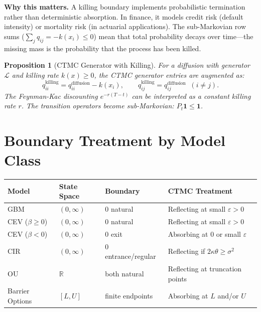 \documentclass[11pt,a4paper,openany]{book}
\theoremstyle{definition}
\theoremstyle{plain}
\newtheorem{proposition}[theorem]{Proposition}
\theoremstyle{remark}
\newcommand{\1}{\mathbbm{1}}
\newcommand{\R}{\mathbb{R}}
\begin{document}
\medskip
\noindent\textbf{Why this matters.} A killing boundary implements probabilistic termination rather than deterministic absorption. In finance, it models credit risk (default intensity) or mortality risk (in actuarial applications). The sub-Markovian row sums ($\sum_{j} q_{ij} = -k(x_i) \leq 0$) mean that total probability decays over time---the missing mass is the probability that the process has been killed.

\begin{proposition}[CTMC Generator with Killing]
For a diffusion with generator $\mathcal{L}$ and killing rate $k(x) \geq 0$, the CTMC generator entries are augmented as:
\[
q_{ii}^{\text{killing}} = q_{ii}^{\text{diffusion}} - k(x_{i}), \qquad q_{ij}^{\text{killing}} = q_{ij}^{\text{diffusion}} \;\; (i \neq j).
\]
The Feynman-Kac discounting $e^{-r(T-t)}$ can be interpreted as a constant killing rate $r$. The transition operators become sub-Markovian: $P_{t} \mathbf{1} \leq \mathbf{1}$.
\end{proposition}

\section{Boundary Treatment by Model Class}

\begin{center}
\begin{tabular}{>{\raggedright\arraybackslash}p{2.5cm}>{\raggedright\arraybackslash}p{2.8cm}>{\raggedright\arraybackslash}p{2.5cm}>{\raggedright\arraybackslash}p{4cm}}
\toprule
\textbf{Model} & \textbf{State Space} & \textbf{Boundary} & \textbf{CTMC Treatment} \\
\midrule
GBM & $(0,\infty)$ & $0$ natural & Reflecting at small $\varepsilon > 0$ \\
CEV ($\beta \geq 0$) & $(0,\infty)$ & $0$ natural & Reflecting at small $\varepsilon > 0$ \\
CEV ($\beta < 0$) & $(0,\infty)$ & $0$ exit & Absorbing at $0$ or small $\varepsilon$ \\
CIR & $(0,\infty)$ & $0$ entrance/regular & Reflecting if $2\kappa\theta \geq \sigma^{2}$ \\
OU & $\R$ & both natural & Reflecting at truncation points \\
Barrier Options & $[L,U]$ & finite endpoints & Absorbing at $L$ and/or $U$ \\
\bottomrule
\end{tabular}
\end{center}
\end{document}
